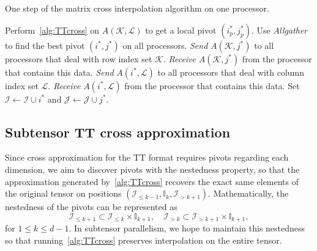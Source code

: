 \documentclass[11pt,a4paper,review]{siamart220329}
\begin{document}
\begin{algorithm}
\caption{One step of the matrix cross interpolation algorithm on one processor.}
\begin{algorithmic}[1]
\label{alg:submatrixCross}
\State Perform~\cref{alg:TTcross} on $A(\mathcal{K},\mathcal{L})$ to get a local pivot $(i^*_p,j^*_p)$.
\State Use \textit{Allgather} to find the best pivot $(i^*,j^*)$ on all processors.
\State \textit{Send} $A(\mathcal{K},j^*)$ to all processors that deal with row index set $\mathcal{K}$.
\Else
\State \textit{Receive} $A(\mathcal{K},j^*)$ from the processor that contains this data.
\EndIf
{}
\State \textit{Send} $A(i^*,\mathcal{L})$ to all processors that deal with column index set $\mathcal{L}$.
\Else
\State \textit{Receive} $A(i^*,\mathcal{L})$ from the processor that contains this data.
\EndIf
\State Set $\mathcal{I} \leftarrow \mathcal{I}\cup i^*$ and $\mathcal{J} \leftarrow \mathcal{J}\cup j^*$.
\end{algorithmic}   
\end{algorithm}

\subsection{Subtensor TT cross approximation}
\label{sec:TTcrossAlg}
Since cross approximation for the TT format requires pivots regarding each dimension, we aim to discover pivots with the nestedness property, so that the approximation generated by~\cref{alg:TTcross} recovers the exact same elements of the original tensor on positions $(\mathcal{I}_{\le k-1},\mathbb{I}_k,\mathcal{I}_{>k+1})$. Mathematically, the nestedness of the pivots can be represented as
\begin{equation} \label{eq:nestedpivots}
\mathcal{I}_{\le k+1} \subset \mathcal{I}_{\le k} \times \mathbb{I}_{k+1}, \quad \mathcal{I}_{>k} \subset \mathcal{I}_{>k+1} \times \mathbb{I}_{k+1},
\end{equation}
for $1 \le k \le d-1$. In subtensor parallelism, we hope to maintain this nestedness so that running~\cref{alg:TTcross} preserves interpolation on the entire tensor.
\end{document}
